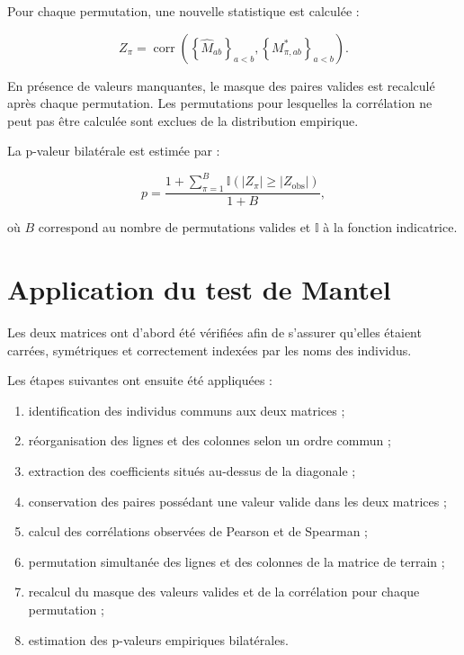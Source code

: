 \documentclass[11pt,a4paper]{report}
\begin{document}
Pour chaque permutation, une nouvelle statistique est calculée :

\begin{equation}
    Z_{\pi}
    =
    \operatorname{corr}
    \left(
    \left\{\hat{M}_{ab}\right\}_{a<b},
    \left\{M^*_{\pi,ab}\right\}_{a<b}
    \right).
\end{equation}

En présence de valeurs manquantes, le masque des paires valides est
recalculé après chaque permutation. Les permutations pour lesquelles la
corrélation ne peut pas être calculée sont exclues de la distribution
empirique.

La p-valeur bilatérale est estimée par :

\begin{equation}
    p
    =
    \frac{
        1+
        \displaystyle\sum_{\pi=1}^{B}
        \mathbb{I}
        \left(
        \left|Z_{\pi}\right|
        \geq
        \left|Z_{\mathrm{obs}}\right|
        \right)
    }{
        1+B
    },
\end{equation}

où $B$ correspond au nombre de permutations valides et
$\mathbb{I}$ à la fonction indicatrice.


\section{Application du test de Mantel}
\label{sec:application_mantel}

Les deux matrices ont d'abord été vérifiées afin de s'assurer qu'elles
étaient carrées, symétriques et correctement indexées par les noms des
individus.

Les étapes suivantes ont ensuite été appliquées :

\begin{enumerate}
    \item identification des individus communs aux deux matrices ;
    \item réorganisation des lignes et des colonnes selon un ordre
    commun ;
    \item extraction des coefficients situés au-dessus de la diagonale ;
    \item conservation des paires possédant une valeur valide dans les
    deux matrices ;
    \item calcul des corrélations observées de Pearson et de Spearman ;
    \item permutation simultanée des lignes et des colonnes de la
    matrice de terrain ;
    \item recalcul du masque des valeurs valides et de la corrélation
    pour chaque permutation ;
    \item estimation des p-valeurs empiriques bilatérales.
\end{enumerate}
\end{document}
